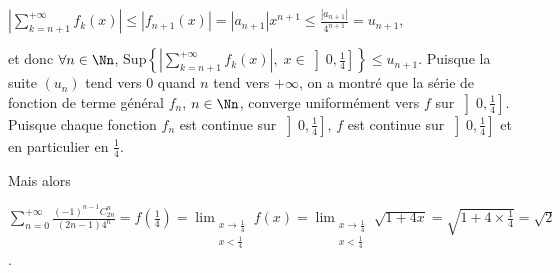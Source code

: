 {{\begin{center}
$\left|\sum_{k=n+1}^{+\infty}f_k(x)\right|\leqslant|f_{n+1}(x)|=|a_{n+1}|x^{n+1}\leqslant \frac{|a_{n+1}|}{4^{n+1}}=u_{n+1}$,
\end{center}

et donc $\forall n\in\Nn$, $\text{Sup}\left\{\left|\sum_{k=n+1}^{+\infty}f_k(x)\right|,\;x\in\left]0, \frac{1}{4}\right]\right\}\leqslant u_{n+1}$. Puisque la suite $(u_n)$ tend vers $0$ quand $n$ tend vers $+\infty$, on a montré que la série de fonction de terme général $f_n$, $n\in\Nn$, converge uniformément vers $f$ sur $\left]0, \frac{1}{4}\right]$. Puisque chaque fonction $f_n$ est continue sur $\left]0, \frac{1}{4}\right]$, $f$ est continue sur $\left]0, \frac{1}{4}\right]$ et en particulier en $ \frac{1}{4}$.

Mais alors

\begin{center}
$\sum_{n=0}^{+\infty} \frac{(-1)^{n-1}C_{2n}^n}{(2n-1)4^n}=f\left( \frac{1}{4}\right)=\displaystyle\lim_{\substack{x\rightarrow\frac{1}{4}\\
x<\frac{1}{4}}}f(x)=\displaystyle\lim_{\substack{x\rightarrow\frac{1}{4}\\
x<\frac{1}{4}}}\sqrt{1+4x}=\sqrt{1+4\times \frac{1}{4}}=\sqrt{2}$.
\end{center}

\begin{center}
\end{center}
}
}
